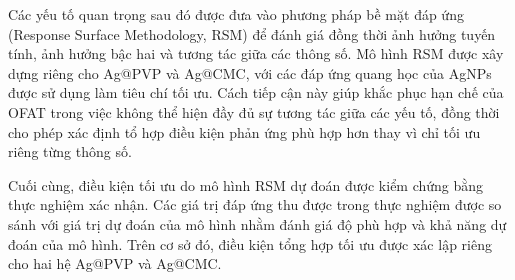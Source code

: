 Các yếu tố quan trọng sau đó được đưa vào phương pháp bề mặt đáp ứng (Response Surface Methodology, RSM) để đánh giá đồng thời ảnh hưởng tuyến tính, ảnh hưởng bậc hai và tương tác giữa các thông số. 
Mô hình RSM được xây dựng riêng cho Ag@PVP và Ag@CMC, với các đáp ứng quang học của AgNPs được sử dụng làm tiêu chí tối ưu. 
Cách tiếp cận này giúp khắc phục hạn chế của OFAT trong việc không thể hiện đầy đủ sự tương tác giữa các yếu tố, đồng thời cho phép xác định tổ hợp điều kiện phản ứng phù hợp hơn thay vì chỉ tối ưu riêng từng thông số.

Cuối cùng, điều kiện tối ưu do mô hình RSM dự đoán được kiểm chứng bằng thực nghiệm xác nhận. 
Các giá trị đáp ứng thu được trong thực nghiệm được so sánh với giá trị dự đoán của mô hình nhằm đánh giá độ phù hợp và khả năng dự đoán của mô hình. 
Trên cơ sở đó, điều kiện tổng hợp tối ưu được xác lập riêng cho hai hệ Ag@PVP và Ag@CMC.